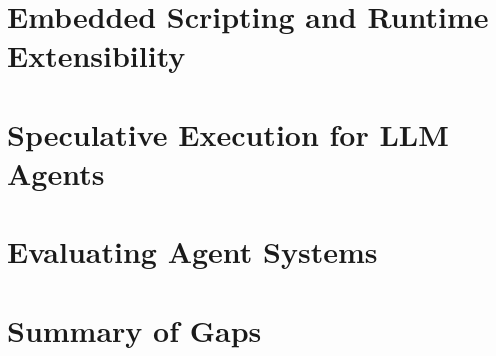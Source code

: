 \section{Embedded Scripting and Runtime Extensibility}
\label{sec:bg-scripting}

\section{Speculative Execution for LLM Agents}
\label{sec:bg-speculation}

\section{Evaluating Agent Systems}
\label{sec:bg-benchmarks}

\section{Summary of Gaps}
\label{sec:bg-gaps}
